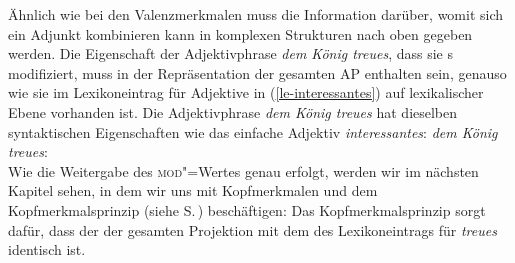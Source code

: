 Ähnlich wie bei den Valenzmerkmalen muss die Information darüber, womit sich ein Adjunkt kombinieren
kann in komplexen Strukturen nach oben gegeben werden. Die Eigenschaft der Adjektivphrase \emph{dem
König treues}, dass sie \nbar{}s modifiziert, muss in der Repräsentation der gesamten AP enthalten sein,
genauso wie sie im Lexikoneintrag für Adjektive in (\ref{le-interessantes}) auf lexikalischer Ebene
vorhanden ist. Die Adjektivphrase \emph{dem König treues} hat dieselben syntaktischen Eigenschaften wie das einfache
Adjektiv \emph{interessantes}:
\ea
\label{avm-dem-koenig-treues}
\emph{dem König treues}:\\
\z
Wie die Weitergabe des \textsc{mod}"=Wertes genau erfolgt, werden wir im nächsten Kapitel sehen, in
dem wir uns mit Kopfmerkmalen und dem Kopfmerkmalsprinzip (siehe S.\,\pageref{prinzip-hfp})
beschäftigen: Das Kopfmerkmalsprinzip sorgt dafür, dass der \modw der gesamten Projektion mit dem
\modw des Lexikoneintrags für \emph{treues} identisch ist. 



